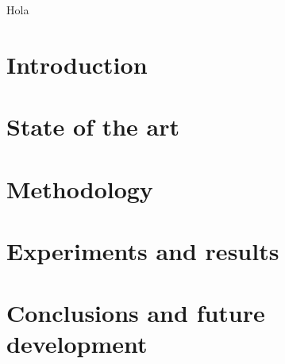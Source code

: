 \documentclass[a4paper,12pt,titlepage]{article}
\begin{document}
Hola \cite{Combalia2019}

\section{Introduction}


\section{State of the art}


\section{Methodology}


\section{Experiments and results}


\section{Conclusions and future development}


\printbibheading
\printbibliography
\end{document}
